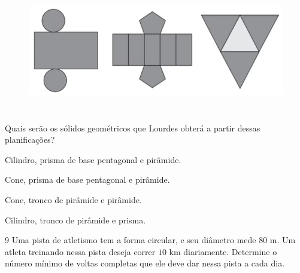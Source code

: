 \begin{figure}[H]
\includegraphics[width=5.90625in,height=2.125in]{./imgSAEB_6_MAT/media/image51.png}
\end{figure}

Quais serão os sólidos geométricos que Lourdes obterá a partir dessas
planificações?

\begin{escolha}
\item Cilindro, prisma de base pentagonal e pirâmide. 
\item Cone, prisma de base pentagonal e pirâmide.
\item Cone, tronco de pirâmide e pirâmide.
\item Cilindro, tronco de pirâmide e prisma.
\end{escolha}

\num{9}  Uma pista de atletismo tem a forma circular, e seu diâmetro mede $80$ m.
Um atleta treinando nessa pista deseja correr $10$ km diariamente.
Determine o número mínimo de voltas completas que ele deve dar nessa
pista a cada dia.








